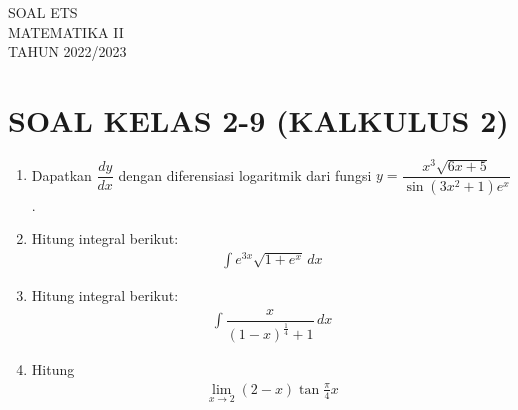 \documentclass{article}
\begin{document}
 \begin{titlepage}
    \vspace*{\fill}
    \begin{center}
      \Huge {SOAL ETS \\ MATEMATIKA II \\ TAHUN 2022/2023}\\[0.4 cm]
    \end{center}
    \vspace*{\fill}
  \end{titlepage}
\makeatletter
\renewcommand*\env@matrix[1][*\c@MaxMatrixCols c]{%
  \hskip -\arraycolsep
  \let\@ifnextchar\new@ifnextchar
  \array{#1}}
\makeatother
\newcount\arrowcount
\newcommand\arrows[1]{
        \global\arrowcount#1
        \ifnum\arrowcount>0
                \begin{matrix}[c]
                \expandafter\nextarrow
        \fi
}

\newcommand\nextarrow[1]{
        \global\advance\arrowcount-1
        \ifx\relax#1\relax\else \xrightarrow{#1}\fi
        \ifnum\arrowcount=0
                \end{matrix}
        \else
                \\
                \expandafter\nextarrow
        \fi
}
\newpage
{}
\section*{SOAL KELAS 2-9 (KALKULUS 2)}
\begin{enumerate}
	\item Dapatkan $\dfrac{dy}{dx}$ dengan diferensiasi logaritmik dari fungsi $y=\dfrac{x^3\sqrt{6x+5}}{\sin(3x^2+1)e^x}$.
	\item Hitung integral berikut:
	\begin{align*}
	\int e^{3x}\sqrt{1+e^x}\, dx
	\end{align*}
	\item Hitung integral berikut:
	\begin{align*}
	\int\dfrac{x}{(1-x)^{\frac{1}{4}}+1}\, dx
	\end{align*}
	\item Hitung
	\begin{align*}
	\lim_{x\rightarrow 2}(2-x)\tan \frac{\pi}{4}x
	\end{align*}
\end{enumerate}
\newpage
\end{document}

